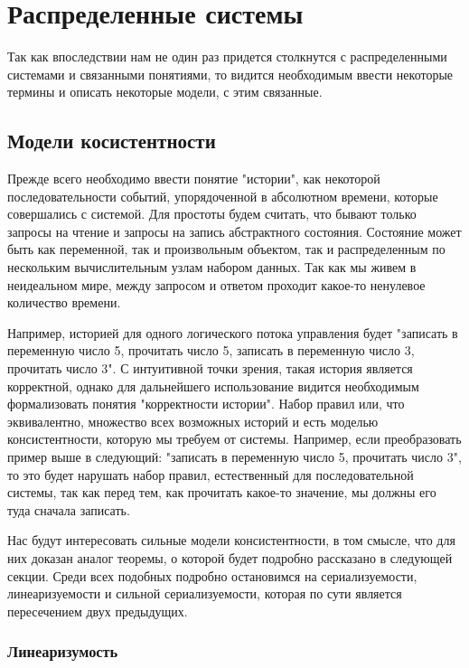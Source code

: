 \section{Распределенные системы}

Так как впоследствии нам не один раз придется столкнутся с распределенными системами и связанными понятиями, то видится необходимым ввести некоторые термины и описать некоторые модели, с этим связанные.

\subsection{Модели косистентности}

Прежде всего необходимо ввести понятие "истории", как некоторой последовательности событий, упорядоченной в абсолютном времени, которые совершались с системой. Для простоты будем считать, что бывают только запросы на чтение и запросы на запись абстрактного состояния. Состояние может быть как переменной, так и произвольным объектом, так и распределенным по нескольким вычислительным узлам набором данных. Так как мы живем в неидеальном мире, между запросом и ответом проходит какое-то ненулевое количество времени.

Например, историей для одного логического потока управления будет "записать в переменную число 5, прочитать число 5, записать в переменную число 3, прочитать число 3". С интуитивной точки зрения, такая история является корректной, однако для дальнейшего использование видится необходимым формализовать понятия "корректности истории". Набор правил или, что эквивалентно, множество всех возможных историй и есть моделью консистентности, которую мы требуем от системы. Например, если преобразовать пример выше в следующий: "записать в переменную число 5, прочитать число 3", то это будет нарушать набор правил, естественный для последовательной системы, так как перед тем, как прочитать какое-то значение, мы должны его туда сначала записать.

Нас будут интересовать сильные модели консистентности, в том смысле, что для них доказан аналог теоремы, о которой будет подробно рассказано в следующей секции. Среди всех подобных подробно остановимся на сериализуемости, линеаризуемости и сильной сериализуемости, которая по сути является пересечением двух предыдущих.

\subsubsection{Линеаризумость}

